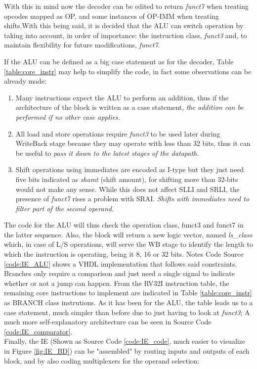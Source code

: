 With this in mind now the decoder can be edited to return \emph{funct7} when treating opcodes mapped as OP, and some instances of OP-IMM when treating shifts.With this being said, it is decided that the ALU can switch operation by taking into account, in order of importance: the instruction class, \emph{funct3} and, to maintain flexibility for future modifications, \emph{funct7}.


If the ALU can be defined as a big case statement as for the decoder, Table \ref{table:core_instr} may help to simplify the code, in fact some observations can be already made:
\begin{enumerate}
\item Many instructions expect the ALU to perform an addition, thus if the architecture of the block is written as a case statement, \emph{the addition can be performed if no other case applies}.
\item All load and store operations require \emph{funct3} to be used later during WriteBack stage because they may operate with less than 32 bits, thus it can be useful to \emph{pass it down to the latest stages of the datapath}.
\item Shift operations using immediates are encoded as I-type but they just need five bits indicated as \emph{shamt} (shift amount), for shifting more than 32-bits would not make any sense. While this does not affect SLLI and SRLI, the presence of \emph{funct7} rises a problem with SRAI. \emph{Shifts with immediates need to filter part of the second operand}.
\end{enumerate}
The code for the ALU will thus check the operation class, funct3 and funct7 in the latter sequence. Also, the block will return a new logic vector, named \emph{ls{\_}class} which, in case of L/S operations, will serve the WB stage to identify the length to which the instruction is operating, being it 8, 16 or 32 bits. Notes Code Source \ref{code:IE_ALU} shows a VHDL implementation that follows said constraints.\\
Branches only require a comparison and just need a single signal to indicate whether or not a jump can happen. From the RV32I instruction table, the remaining core instructions  to implement are indicated in Table \ref{table:core_instr} as BRANCH class instrutions. As it has been for the ALU, the table leads us to a case statement, much simpler than before due to just having to look at \emph{funct3}; A much more self-explanatory architecture can be seen in Source Code \ref{code:IE_comparator}.\\
Finally, the IE (Shown as Source Code \ref{code:IE_code}, much easier to visualize in Figure \ref{fig:IE_BD}) can be "assembled" by routing inputs and outputs of each block, and by also coding multiplexers for the operand selection:

